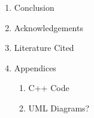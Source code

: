 \documentclass[a4paper,10pt]{article}
\begin{document}
\begin{enumerate}
\begin{enumerate}
  \end{enumerate}
  
  \item Conclusion
  \item Acknowledgements
  \item Literature Cited
  \item Appendices
  \begin{enumerate}
   \item C++ Code
   \item UML Diagrams?
  \end{enumerate}

  
\end{enumerate}
\end{document}
